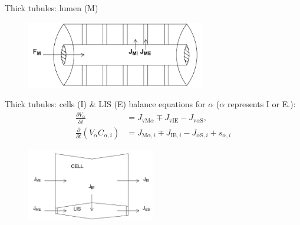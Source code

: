 \documentclass[serif]{beamer}
\begin{document}
\begin{frame}{Thick tubules: lumen (M)}
    \begin{figure}
        \centering
        \includegraphics[width=0.7\textwidth]{figures/thick_tubule.png}
    \end{figure}
\end{frame}

\begin{frame}{Thick tubules: cells (I) \& LIS (E)}
    balance equations for $\alpha$ ($\alpha$ represents I or E.):
    \begin{align}
        \frac{\partial V_{\alpha}}{\partial t} &= J_{\mathrm{vM}\alpha} \mp J_{\mathrm{vIE}}-J_{\mathrm{v}\alpha\mathrm{S}},\\
        \frac{\partial}{\partial t}\left(V_{\alpha}C_{\alpha,i}\right) &= J_{\mathrm{M}\alpha,i} \mp J_{\mathrm{IE},i}-J_{\alpha\mathrm{S},i}+s_{\alpha,i}
    \end{align}
    \begin{figure}
        \centering
        \includegraphics[width=0.5\textwidth]{figures/cell_LIS.png}
    \end{figure}
\end{frame}
\end{document}
